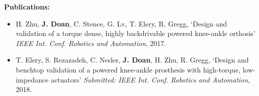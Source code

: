 \textbf{Publications:}
\begin{itemize} 
\item H. Zhu, \textbf{J. Doan}, C. Stence, G. Lv, T. Elery, R. Gregg, `Design and validation of a     torque dense, highly backdrivable powered knee-ankle orthosis' \textit{IEEE Int. Conf. Robotics and Automation}, 2017.
\item T. Elery, S. Rezazadeh, C. Nesler, \textbf{J. Doan}, H. Zhu, R. Gregg, `Design and benchtop validation of a powered knee-ankle prosthesis with high-torque, low-impedance actuators' \textit{Submitted: IEEE Int. Conf. Robotics and Automation}, 2018.
\end{itemize}
